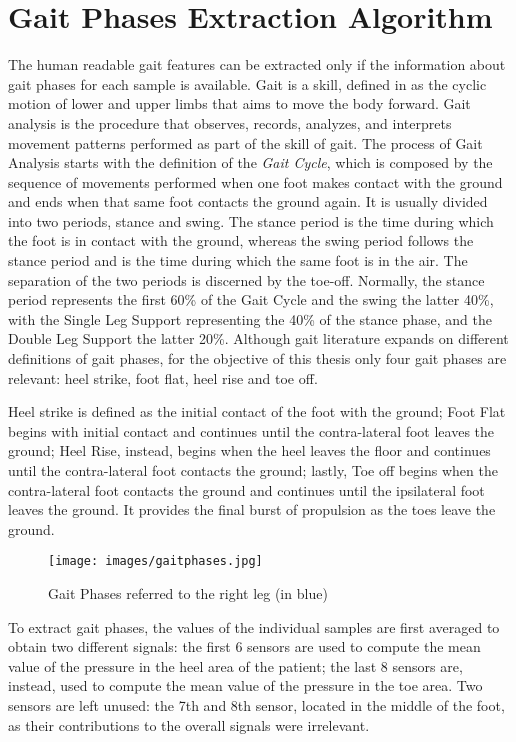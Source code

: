 \section{Gait Phases Extraction Algorithm}
The human readable gait features can be extracted only if the information about gait phases for each sample is available. 
Gait is a skill, defined in \cite{BIOmechanics} as the cyclic motion of lower and upper limbs that aims to move the body forward. Gait analysis is the procedure that observes, records, analyzes, and interprets movement patterns performed as part of the skill of gait.
The process of Gait Analysis starts with the definition of the \textit{Gait Cycle}, which is composed by the sequence of movements performed when one foot makes contact with the ground and ends when that same foot contacts the ground again. It is usually divided into two periods, stance and swing. The stance period is the time during which the foot is in contact with the ground, whereas the swing period follows the stance period and is the time during which the same foot is in the air. The separation of the two periods is discerned by the
toe-off.
Normally, the stance period represents the first
60\% of the Gait Cycle and the swing the latter 40\%, with the Single Leg Support representing the 40\% of the stance phase, and the Double Leg Support the latter 20\%. 
Although gait literature expands on different definitions of gait phases, for the objective of this thesis only four  gait phases are relevant: heel strike, foot flat, heel rise and toe off.

Heel strike is defined as the initial contact of the foot with the ground; Foot Flat begins with initial contact and continues until the contra-lateral foot leaves the ground; Heel Rise, instead, begins when the heel leaves the floor and continues until the contra-lateral foot contacts the ground; lastly, Toe off begins when the contra-lateral foot contacts the ground and continues until the ipsilateral foot leaves the ground. It provides the final burst of propulsion as the toes leave the ground.

\begin{figure}[h!]
    \centering
    \texttt{[image: images/gaitphases.jpg]}
    \caption{Gait Phases referred to the right leg (in blue)}
    \label{fig:gaitphases}
\end{figure}
To extract gait phases, the values of the individual samples are first averaged to obtain two different signals: the first 6 sensors are used to compute the mean value of the pressure in the heel area of the patient; the last 8 sensors are, instead, used to compute the mean value of the pressure in the toe area. Two sensors are left unused: the 7th and 8th sensor, located in the middle of the foot, as their contributions to the overall signals were irrelevant.


